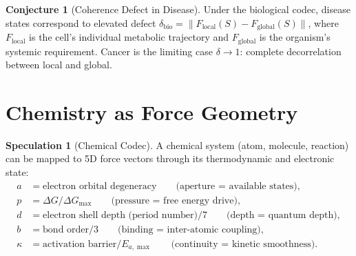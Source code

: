 \documentclass[11pt]{article}
\theoremstyle{definition}
\newtheorem{conjecture}[theorem]{Conjecture}
\newtheorem{speculation}[theorem]{Speculation}
\theoremstyle{remark}
\begin{document}
\begin{conjecture}[Coherence Defect in Disease]
Under the biological codec, disease states correspond to elevated defect
$\delta_{\mathrm{bio}} = \|F_{\mathrm{local}}(S) - F_{\mathrm{global}}(S)\|$,
where $F_{\mathrm{local}}$ is the cell's individual metabolic trajectory and
$F_{\mathrm{global}}$ is the organism's systemic requirement.  Cancer is the
limiting case $\delta \to 1$: complete decorrelation between local and global.
\end{conjecture}

\section{Chemistry as Force Geometry}
\label{sec:chemistry}

\begin{speculation}[Chemical Codec]
\label{spec:chem}
A chemical system (atom, molecule, reaction) can be mapped to 5D force vectors
through its thermodynamic and electronic state:
\begin{align}
  a &= \text{electron orbital degeneracy} \qquad\text{(aperture = available states)}, \\
  p &= \Delta G / \Delta G_{\max} \qquad\text{(pressure = free energy drive)}, \\
  d &= \text{electron shell depth (period number)} / 7 \qquad\text{(depth = quantum depth)}, \\
  b &= \text{bond order} / 3 \qquad\text{(binding = inter-atomic coupling)}, \\
  \kappa &= \text{activation barrier} / E_{a,\max} \qquad\text{(continuity = kinetic smoothness)}.
\end{align}
\end{speculation}
\end{document}
